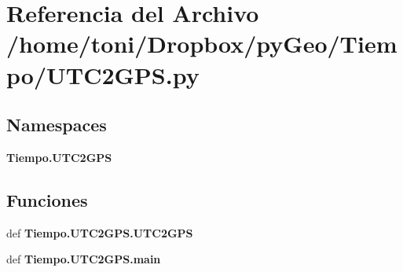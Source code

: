 \section{Referencia del Archivo /home/toni/\-Dropbox/py\-Geo/\-Tiempo/\-U\-T\-C2\-G\-P\-S.py}
\label{UTC2GPS_8py}
\subsection*{Namespaces}
\begin{DoxyCompactItemize}
\item 
{\bf Tiempo.\-U\-T\-C2\-G\-P\-S}
\end{DoxyCompactItemize}
\subsection*{Funciones}
\begin{DoxyCompactItemize}
\item 
def {\bf Tiempo.\-U\-T\-C2\-G\-P\-S.\-U\-T\-C2\-G\-P\-S}
\item 
def {\bf Tiempo.\-U\-T\-C2\-G\-P\-S.\-main}
\end{DoxyCompactItemize}
